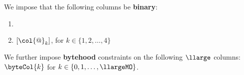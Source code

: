We impose that the following columns be \textbf{binary}:
\begin{enumerate}
	\item \depStatus{}
	\item $[\col{@}_{k}]$, for $k \in \{1, 2, \dots, 4 \}$
\end{enumerate}
We further impose \textbf{bytehood} constraints on the following $\llarge$ columns: $\byteCol{k}$ for $k \in \{0, 1, \dots, \llargeMO\}$. 
